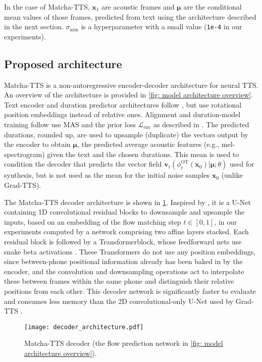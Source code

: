 \documentclass[british]{article}
\newcommand{\x}{\boldsymbol{x}}
\begin{document}
In the case of Matcha-TTS, $\x_1$ are acoustic frames and $\boldsymbol{\mu}$ are the conditional mean values of those frames, predicted from text using the architecture described in the next section.
$\sigma_{\mathrm{min}}$ is a hyperparameter with a small value (\texttt{1e-4} in our experiments).








\subsection{Proposed architecture}
\label{ssec:matcha}


Matcha-TTS is a non-autoregressive encoder-decoder architecture for neural TTS.
An overview of the architecture is provided in \cref{fig: model architecture overview}.
Text encoder and duration predictor architectures follow \cite{kim2020glow,popov2021grad}, but use rotational position embeddings \cite{su2021roformer} instead of relative ones.
Alignment and duration-model training follow use MAS and the prior loss $\mathcal{L}_{\mathrm{enc}}$ as described in \cite{popov2021grad}.
The predicted durations, rounded up, are used to upsample (duplicate) the vectors output by the encoder to obtain $\boldsymbol{\mu}$, the predicted average acoustic features (e.g., mel-spectrogram) given the text and the chosen durations.
This mean is used to condition the decoder that predicts the vector field $\boldsymbol{v}_t(\phi^{\mathrm{OT}}_t(\x_0) | \boldsymbol{\mu}; \theta)$ used for synthesis, but is not used as the mean for the initial noise samples $\x_0$ (unlike Grad-TTS).

The Matcha-TTS decoder architecture is shown in \cref{fig: decoder architecture}.
Inspired by \cite{rombach2022high}, it is a U-Net containing 1D convolutional residual blocks to downsample and upsample the inputs, based on an embedding of the flow matching step $t\in[0,1]$, in our experiments computed by a network comprising two affine layers stacked.
Each residual block is followed by a Transformerblock, whose feedforward nets use snake beta activations \cite{lee2023bigvgan}.
These Transformers do not use any position embeddings, since between-phone positional information already has been baked in by the encoder, and the convolution and downsampling operations act to interpolate these between frames within the same phone and distinguish their relative positions from each other.
This decoder network is significantly faster to evaluate and consumes less memory than the 2D convolutional-only U-Net used by Grad-TTS \cite{popov2021grad}.
\begin{figure}[!t]
\centering
\texttt{[image: decoder\_architecture.pdf]}
\caption{Matcha-TTS decoder (the flow prediction network in \cref{fig: model architecture overview}).}
\label{fig: decoder architecture}
\vspace{-\baselineskip}
\end{figure}
\end{document}
